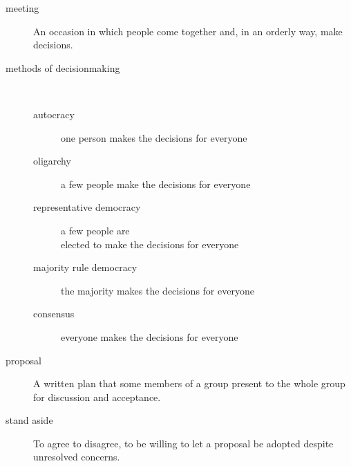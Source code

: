 \begin{description}
\item [meeting]
An occasion in which people come together and, in an orderly way, make decisions.
\item [methods of decisionmaking] ~
\begin{description}
\item [autocracy]
one person makes the decisions for everyone
\item [oligarchy]
a few people make the decisions for everyone
\item [representative democracy]
a few people are\\ elected to make the decisions for everyone
\item [majority rule democracy]
the majority makes the decisions for everyone
\item [consensus]
everyone makes the decisions for everyone

\end{description}
\item [proposal]
A written plan that some members of a group present to the whole group for discussion and acceptance.
\item [stand aside] To agree to disagree, to be willing to let a proposal be adopted despite unresolved concerns.
\end{description}
 
